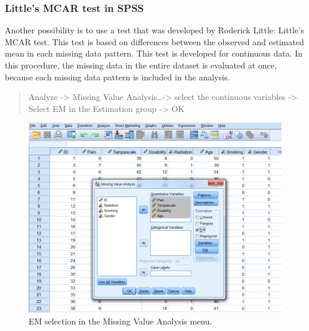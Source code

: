 \documentclass[]{book}
\begin{document}
\subsubsection{Little's MCAR test in
SPSS}\label{littles-mcar-test-in-spss}

Another possibility is to use a test that was developed by Roderick
Little: Little's MCAR test. This test is based on differences between
the observed and estimated mean in each missing data pattern. This test
is developed for continuous data. In this procedure, the missing data in
the entire dataset is evaluated at once, because each missing data
pattern is included in the analysis.

\begin{quote}
Analyze -\textgreater{} Missing Value Analysis\ldots{}-\textgreater{}
select the continuous variables -\textgreater{} Select EM in the
Estimation group -\textgreater{} OK
\end{quote}

\begin{figure}

{\centering \includegraphics[width=0.9\linewidth]{images/fig2.12} 

}

\caption{EM selection in the Missing Value Analysis menu.}\label{fig:fig2-12}
\end{figure}
\end{document}
